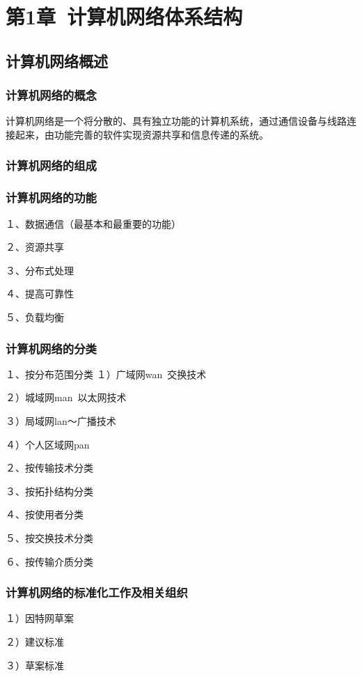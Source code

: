 \documentclass{ctexart}
\begin{document}
\tableofcontents

\section{第1章\ 计算机网络体系结构}

\subsection{计算机网络概述}
\subsubsection{计算机网络的概念}
计算机网络是一个将分散的、具有独立功能的计算机系统，通过通信设备与线路连接起来，由功能完善的软件实现资源共享和信息传递的系统。


\subsubsection{计算机网络的组成}
\subsubsection{计算机网络的功能}
１、数据通信（最基本和最重要的功能）

２、资源共享

３、分布式处理

４、提高可靠性

５、负载均衡
\subsubsection{计算机网络的分类}
１、按分布范围分类
１）广域网wan~交换技术

２）城域网man~以太网技术

３）局域网lan～广播技术

４）个人区域网pan

２、按传输技术分类

３、按拓扑结构分类

４、按使用者分类

５、按交换技术分类

６、按传输介质分类

\subsubsection{计算机网络的标准化工作及相关组织}
１）因特网草案

２）建议标准

３）草案标准
\end{document}
